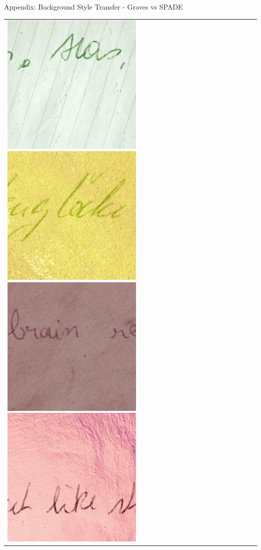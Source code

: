 \documentclass[aspectratio=169]{beamer}
\begin{document}
\begin{frame}{Appendix: Background Style Transfer - Graves vs SPADE}
{\begin{tabular}{lc}
{  \includegraphics[scale=0.18]{../thesis/assets/background_style_transfer/spade/style/46.png}%
  \includegraphics[scale=0.18]{../thesis/assets/background_style_transfer/spade/style/49.png}%
  \includegraphics[scale=0.18]{../thesis/assets/background_style_transfer/spade/style/31.png}%
  \includegraphics[scale=0.18]{../thesis/assets/background_style_transfer/spade/style/74.png}%
}
\end{tabular}}
\end{frame}
\end{document}
